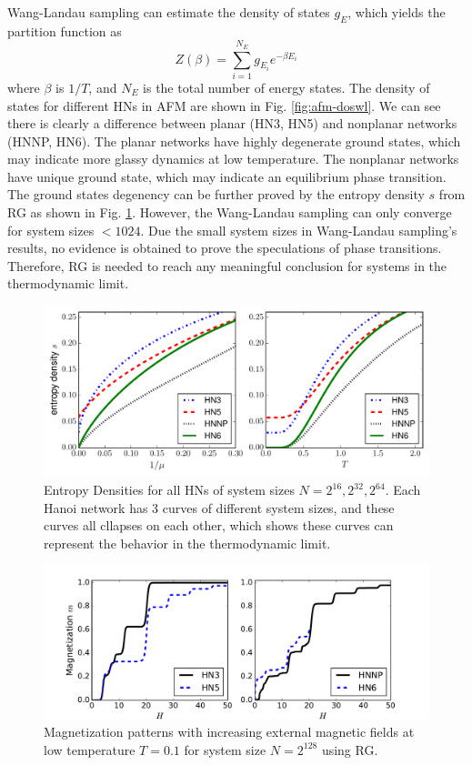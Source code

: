 Wang-Landau sampling can estimate the density of states $g_E$, which yields the partition function as 
\begin{equation}
Z(\beta)=\sum_{i=1}^{N_{E}}g_{E_i}e^{-\beta E_i}
\end{equation}
where $\beta$ is $1/T$, and $N_E$ is the total number of energy states. The density of states for different HNs in AFM are shown in Fig. \ref{fig:afm-doswl}. We can see there is clearly a difference between planar (HN3, HN5) and nonplanar networks (HNNP, HN6). The planar networks have highly degenerate ground states, which may indicate more glassy dynamics at low temperature. The nonplanar networks have unique ground state, which may indicate an equilibrium phase transition. The ground states degenency can be further proved by the entropy density $s$ from RG as shown in Fig. \ref{fig:afm-entropy}. However, the Wang-Landau sampling can only converge for system sizes $<1024$. Due the small system sizes in Wang-Landau sampling's results, no evidence is obtained to prove the speculations of phase transitions.
Therefore, RG is needed to reach any meaningful conclusion for systems in the thermodynamic limit.

\begin{figure}[h]
\centering \includegraphics[width=0.88\columnwidth]{Chapter-3/HNs_entropy_density.pdf}
\protect\caption{Entropy Densities for all HNs of system sizes $N=2^{16}, 2^{32}, 2^{64}$. Each Hanoi network has 3 curves of different system sizes, and these curves all cllapses on each other, which shows these curves can represent the behavior in the thermodynamic limit.  }
\label{fig:afm-entropy} 
\end{figure}

\begin{figure}[h]
\centering \includegraphics[width=0.9\columnwidth]{Chapter-3/HNs_MagvsH_m_vs_H.pdf}
\protect\caption{Magnetization patterns with increasing external magnetic fields at low temperature $T=0.1$ for system size $N=2^{128}$ using RG.}
\label{fig:afm-magplt}
\end{figure}

